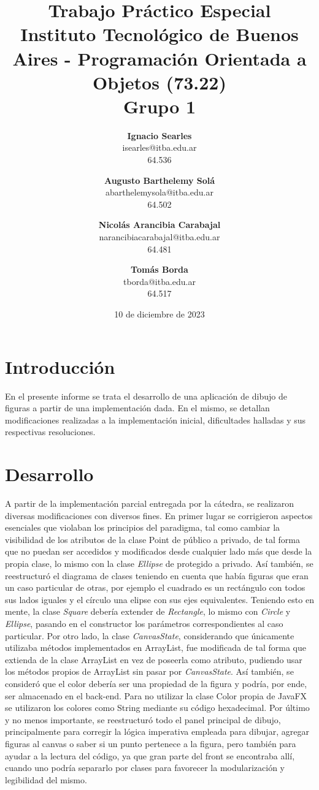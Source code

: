 \documentclass[12pt]{article}
\title{\textbf{Trabajo Práctico Especial} \\ [1ex]
\large Instituto Tecnológico de Buenos Aires - Programación Orientada a Objetos (73.22) \\ [1ex]
\large Grupo 1 }
\date{10 de diciembre de 2023}
\author{
\textbf{Ignacio Searles}\\
isearles@itba.edu.ar\\
64.536
\and
\textbf{Augusto Barthelemy Solá}\\
abarthelemysola@itba.edu.ar\\
64.502
\and
\textbf{Nicolás Arancibia Carabajal}\\
narancibiacarabajal@itba.edu.ar\\
64.481
\and
\textbf{Tomás Borda}\\
tborda@itba.edu.ar\\
64.517
}
\begin{document}
\maketitle

\section* {Introducción}

En el presente informe se trata el desarrollo de una aplicación de dibujo de figuras a partir de una implementación dada. En el mismo, se detallan modificaciones realizadas a la implementación inicial, dificultades halladas y sus respectivas resoluciones.

\section* {Desarrollo}

A partir de la implementación parcial entregada por la cátedra, se realizaron diversas modificaciones con diversos fines. En primer lugar se corrigieron aspectos esenciales que violaban los principios del paradigma, tal como cambiar la visibilidad de los atributos de la clase Point de público a privado, de tal forma que no puedan ser accedidos y modificados desde cualquier lado más que desde la propia clase, lo mismo con la clase \textit{Ellipse} de protegido a privado. Así también, se reestructuró el diagrama de clases teniendo en cuenta que había figuras que eran un caso particular de otras, por ejemplo el cuadrado es un rectángulo con todos sus lados iguales y el círculo una elipse con sus ejes equivalentes. Teniendo esto en mente, la clase \textit{Square} debería extender de \textit{Rectangle}, lo mismo con \textit{Circle} y \textit{Ellipse}, pasando en el constructor los parámetros correspondientes al caso particular. Por otro lado, la clase \textit{CanvasState}, considerando que únicamente utilizaba métodos implementados en ArrayList, fue modificada de tal forma que extienda de la clase ArrayList en vez de poseerla como atributo, pudiendo usar los métodos propios de ArrayList sin pasar por \textit{CanvasState}. Así también, se consideró que el color debería ser una propiedad de la figura y podría, por ende, ser almacenado en el back-end. Para no utilizar la clase Color propia de JavaFX se utilizaron los colores como String mediante su código hexadecimal. Por último y no menos importante, se reestructuró todo el panel principal de dibujo, principalmente para corregir la lógica imperativa empleada para dibujar, agregar figuras al canvas o saber si un punto pertenece a la figura, pero también para ayudar a la lectura del código, ya que gran parte del front se encontraba allí, cuando uno podría separarlo por clases para favorecer la modularización y legibilidad del mismo. 
\end{document}
